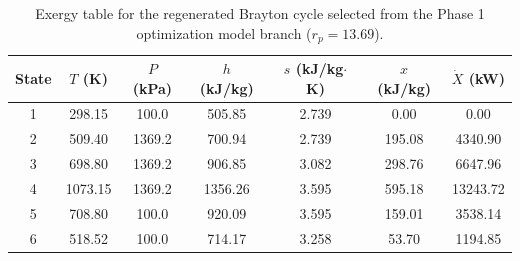 \begin{table}[htbp]
    \centering
    \caption{Exergy table for the regenerated Brayton cycle selected from the Phase 1 optimization model branch ($r_p = 13.69$).}
    \label{tab:phase5_exergy_phase1_optimization}
    \begin{tabular}{c c c c c c c}
        \hline
        State & $T$ (K) & $P$ (kPa) & $h$ (kJ/kg) & $s$ (kJ/kg$\cdot$K) & $x$ (kJ/kg) & $\dot{X}$ (kW) \\
        \hline
        1 & 298.15 & 100.0 & 505.85 & 2.739 & 0.00 & 0.00 \\
        2 & 509.40 & 1369.2 & 700.94 & 2.739 & 195.08 & 4340.90 \\
        3 & 698.80 & 1369.2 & 906.85 & 3.082 & 298.76 & 6647.96 \\
        4 & 1073.15 & 1369.2 & 1356.26 & 3.595 & 595.18 & 13243.72 \\
        5 & 708.80 & 100.0 & 920.09 & 3.595 & 159.01 & 3538.14 \\
        6 & 518.52 & 100.0 & 714.17 & 3.258 & 53.70 & 1194.85 \\
        \hline
    \end{tabular}
\end{table}